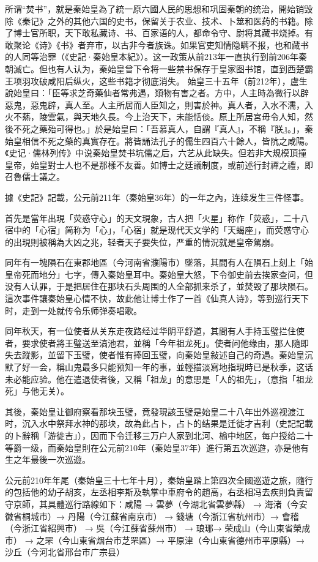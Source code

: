 所谓“焚书”，就是秦始皇為了統一原六國人民的思想和巩固秦朝的统治，開始销毁除《秦记》之外的其他六国的史书，保留关于农业、技术、卜筮和医药的书籍。除了博士官所职，天下敢私藏诗、书、百家语的人，都命令守、尉将其藏书烧掉。有敢聚论《诗》《书》者弃市，以古非今者族诛。如果官吏知情隐瞒不报，也和藏书的人同等治罪（《史記·秦始皇本紀》）。这一政策从前213年一直执行到前206年秦朝滅亡。但也有人认为，秦始皇曾下令将一些禁书保存于皇家图书馆，直到西楚霸王项羽攻破咸阳后纵火，这些书籍才彻底消失。
始皇三十五年（前212年），盧生說始皇曰：「臣等求芝奇藥仙者常弗遇，類物有害之者。方中，人主時為微行以辟惡鬼，惡鬼辟，真人至。人主所居而人臣知之，則害於神。真人者，入水不濡，入火不爇，陵雲氣，與天地久長。今上治天下，未能恬倓。原上所居宮毋令人知，然後不死之藥殆可得也。」於是始皇曰：「吾慕真人，自謂『真人』，不稱『朕』。」，秦始皇相信不死之藥的真實存在。將皆誦法孔子的儒生四百六十餘人，皆阬之咸陽。《史记·儒林列传》中说秦始皇焚书坑儒之后，六艺从此缺失。但若非大規模頂撞皇帝，始皇對士人也不是那樣不友善。如博士之廷議制度，或前述行封禪之禮，即召魯儒士議之。

據《史記》記載，公元前211年（秦始皇36年）的一年之內，连续发生三件怪事。

首先是當年出現「荧惑守心」的天文現象，古人把「火星」称作「荧惑」，二十八宿中的「心宿」简称为「心」，「心宿」就是现代天文学的「天蝎座」，而荧惑守心的出現則被稱為大凶之兆，轻者天子要失位，严重的情況就是皇帝駕崩。

同年有一塊隕石在東郡地區（今河南省濮陽市）墜落，其間有人在隕石上刻上「始皇帝死而地分」七字，傳入秦始皇耳中。秦始皇大怒，下令御史前去挨家查问，但没有人认罪，于是把居住在那块石头周围的人全部抓来杀了，並焚毁了那块陨石。這次事件讓秦始皇心情不快，故此他让博士作了一首《仙真人诗》，等到巡行天下时，走到一处就传令乐师弹奏唱歌。

同年秋天，有一位使者从关东走夜路经过华阴平舒道，其間有人手持玉璧拦住使者，要求使者將王璧送至滈池君，並稱「今年祖龙死」。使者问他缘由，那人隨即失去蹤影，並留下玉璧，使者惟有捧回玉璧，向秦始皇敍述自己的奇遇。秦始皇沉默了好一会，稱山鬼最多只能预知一年的事，並輕描淡寫地指現時已是秋季，这话未必能应验。他在遣退使者後，又稱「祖龙」的意思是「人的祖先」，（意指「祖龙死」与他无关）。

其後，秦始皇让御府察看那块玉璧，竟發現該玉璧是始皇二十八年出外巡视渡江时，沉入水中祭拜水神的那块，故為此占卜，占卜的结果是迁徙才吉利（史記記載的卜辭稱「游徙吉」），因而下令迁移三万户人家到北河、榆中地区，每户授给二十等爵一级，而秦始皇則在公元前210年（秦始皇37年）進行第五次巡遊，亦是他有生之年最後一次巡遊。

公元前210年年尾（秦始皇三十七年十月），秦始皇踏上第四次全國巡遊之旅，隨行的包括他的幼子胡亥，左丞相李斯及執掌中車府令的趙高，右丞相冯去疾則負責留守京師，其具體巡行路線如下：咸陽 → 雲夢（今湖北省雲夢縣） → 海渚（今安徽省桐城市）→ 丹陽（今江蘇省南京市） → 錢塘（今浙江省杭州市）→ 會稽（今浙江省紹興市） → 吳（今江蘇省蘇州市） → 琅琊→ 荣成山（今山東省榮成市） → 之罘（今山東省烟台市芝罘區）→ 平原津（今山東省德州市平原縣）→ 沙丘（今河北省邢台市广宗县）

